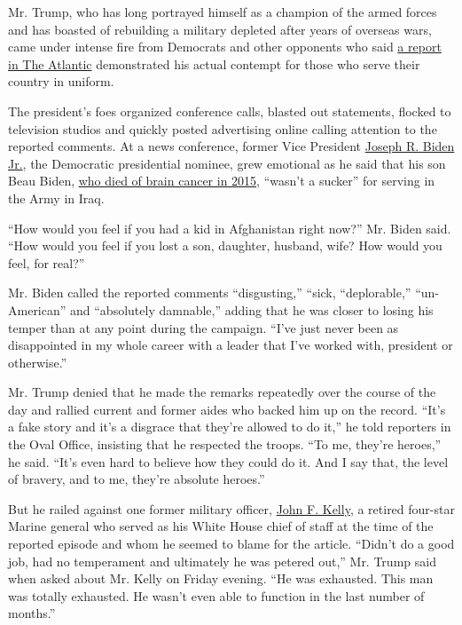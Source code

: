 Mr. Trump, who has long portrayed himself as a champion of the armed
forces and has boasted of rebuilding a military depleted after years of
overseas wars, came under intense fire from Democrats and other
opponents who said
\href{https://www.theatlantic.com/politics/archive/2020/09/trump-americans-who-died-at-war-are-losers-and-suckers/615997/}{a
report in The Atlantic} demonstrated his actual contempt for those who
serve their country in uniform.

The president's foes organized conference calls, blasted out statements,
flocked to television studios and quickly posted advertising online
calling attention to the reported comments. At a news conference, former
Vice President
\href{https://www.nytimes3xbfgragh.onion/interactive/2020/us/elections/joe-biden.html}{Joseph
R. Biden Jr.}, the Democratic presidential nominee, grew emotional as he
said that his son Beau Biden,
\href{https://www.nytimes3xbfgragh.onion/2015/05/31/us/politics/joseph-r-biden-iii-vice-presidents-son-beau-dies-at-46.html}{who
died of brain cancer in 2015}, ``wasn't a sucker'' for serving in the
Army in Iraq.

``How would you feel if you had a kid in Afghanistan right now?'' Mr.
Biden said. ``How would you feel if you lost a son, daughter, husband,
wife? How would you feel, for real?''

Mr. Biden called the reported comments ``disgusting,'' ``sick,
``deplorable,'' ``un-American'' and ``absolutely damnable,'' adding that
he was closer to losing his temper than at any point during the
campaign. ``I've just never been as disappointed in my whole career with
a leader that I've worked with, president or otherwise.''

Mr. Trump denied that he made the remarks repeatedly over the course of
the day and rallied current and former aides who backed him up on the
record. ``It's a fake story and it's a disgrace that they're allowed to
do it,'' he told reporters in the Oval Office, insisting that he
respected the troops. ``To me, they're heroes,'' he said. ``It's even
hard to believe how they could do it. And I say that, the level of
bravery, and to me, they're absolute heroes.''

But he railed against one former military officer,
\href{https://www.nytimes3xbfgragh.onion/2020/09/04/us/politics/kelly-trump.html}{John
F. Kelly}, a retired four-star Marine general who served as his White
House chief of staff at the time of the reported episode and whom he
seemed to blame for the article. ``Didn't do a good job, had no
temperament and ultimately he was petered out,'' Mr. Trump said when
asked about Mr. Kelly on Friday evening. ``He was exhausted. This man
was totally exhausted. He wasn't even able to function in the last
number of months.''


